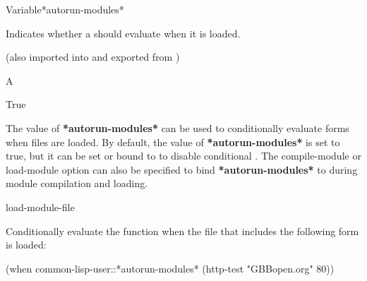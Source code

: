 \documentclass[10pt,twoside,english,pdftex]{article}
\begin{document}
\begin{functiondoc}{Variable}{*autorun-modules*}{}%

\fnsyntax

\fnpurpose Indicates whether a  should evaluate
 when it is loaded.

\fnpackage {}
(also imported into and exported from )

\fnmodule {}

\fnvaluetype A 

\fninitialvalue True

\fndescription The value of \textbf{*autorun-modules*} can be used to
conditionally evaluate forms when  files are loaded.  By
default, the value of \textbf{*autorun-modules*} is set to true, but it can be
set or bound to  to disable conditional .  The
compile-module or load-module option  can also be specified
to bind \textbf{*autorun-modules*} to  during module compilation and
loading.

\begin{alsos}{load-module-file}
\end{alsos}

\fnexample
Conditionally evaluate the  function when the file 
 that includes the following form is loaded:
%
\W\supp
\begin{example}
  (when common-lisp-user::*autorun-modules*
    (http-test "GBBopen.org" 80))
\end{example}

\end{functiondoc}

\end{document}
